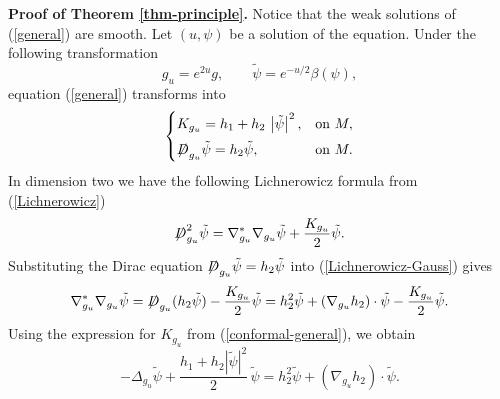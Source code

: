 \documentclass[a4paper, 12pt]{article}
\def\slashiii#1{\setbox0=\hbox{$#1$}#1\hskip-\wd0\hbox to\wd0{\hss\sl/\/\hss}}
\begin{document}
\noindent\textbf{Proof of Theorem \ref{thm-principle}.} Notice that the weak solutions of (\ref{general}) are smooth. Let \( (u,\psi) \) be a solution of the equation. Under the following transformation
\[
g_u = e^{2u}g,\qquad \tilde{\psi} = e^{-u/2}\beta\left( \psi\right) ,
\]
equation (\ref{general}) transforms into
\begin{equation}\label{conformal-general}
	\begin{cases}
		K_{g_u} = h_1 + h_2 \, \left| {\tilde \psi } \right|^2, & \text{on } M, \\[4pt]
		\slashiii{D}_{g_u} \tilde{\psi} = h_2 \tilde{\psi}, & \text{on } M.
	\end{cases}
\end{equation}
In dimension two we have the following Lichnerowicz formula from (\ref{Lichnerowicz})
\begin{equation}\label{Lichnerowicz-Gauss}
	\slashiii{D}_{g_u}^2 \tilde{\psi} = \nabla_{g_u}^*\nabla_{g_u}\tilde{\psi} + \frac{K_{g_u}}{2}\tilde{\psi}.
\end{equation}
Substituting the Dirac equation \( \slashiii{D}_{g_u}\tilde{\psi}=h_2\tilde{\psi} \) into (\ref{Lichnerowicz-Gauss}) gives
\[
\nabla_{g_u}^*\nabla_{g_u}\tilde{\psi}
= \slashiii{D}_{g_u}(h_2\tilde{\psi}) - \frac{K_{g_u}}{2}\tilde{\psi}
= h_2^2\tilde{\psi} + (\nabla_{g_u}h_2)\cdot\tilde{\psi} - \frac{K_{g_u}}{2}\tilde{\psi}.
\]
Using the expression for \( K_{g_u} \) from (\ref{conformal-general}), we obtain
\begin{equation}\label{Laplace-spin}
	-\Delta_{g_u}\tilde{\psi} + \frac{h_1+h_2\left| {\tilde \psi } \right|^2}{2}\,\tilde{\psi}
	= h_2^2\tilde{\psi} + (\nabla_{g_u}h_2)\cdot\tilde{\psi}.
\end{equation}
\end{document}
